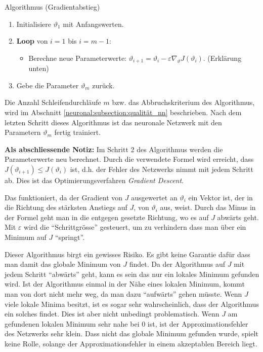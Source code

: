 \begin{aufgabe}
    Algorithmus (Gradientabstieg)
    \begin{enumerate}
        \item Initialisiere \( \vartheta_1 \) mit Anfangswerten.
        \item \textbf{Loop} von \( i = 1 \) bis \( i = m - 1 \):
        \begin{itemize}
            \item Berechne neue Parameterwerte: \( \vartheta_{i+1} = \vartheta_i - \varepsilon \nabla_\vartheta J\left(\vartheta_i\right) \). (Erklärung unten)
        \end{itemize}
        \item Gebe die Parameter \( \vartheta_m \) zurück.
    \end{enumerate}
\end{aufgabe}

Die Anzahl Schleifendurchläufe \( m \) bzw. das Abbruchskriterium des Algorithmus, wird im Abschnitt \ref{neuronal:subsection:qualität_nn} beschrieben.
Nach dem letzten Schritt dieses Algorithmus ist das neuronale Netzwerk mit den Parametern \( \vartheta_m \) fertig trainiert.

\textbf{Als abschliessende Notiz:} Im Schritt 2 des Algorithmus werden die Parameterwerte neu berechnet.
Durch die verwendete Formel wird erreicht, dass \( J(\vartheta_{i+1}) \leq J(\vartheta_i) \) ist, d.h. der Fehler des Netzwerks nimmt mit jedem Schritt ab.
Dies ist das Optimierungsverfahren \emph{Gradient Descent}.

Das funktioniert, da der Gradient von \( J \) ausgewertet an \( \vartheta_i \) ein Vektor ist, der in die Richtung des stärksten Anstiegs auf \( J \), von \(\vartheta_i \) aus, weist.
Durch das Minus in der Formel geht man in die entgegen gesetzte Richtung, wo es auf \( J \) abwärts geht. 
Mit \( \varepsilon \) wird die ``Schrittgrösse'' gesteuert, um zu verhindern dass man über ein Minimum auf \( J \) ``springt''.

Dieser Algorithmus birgt ein gewisses Risiko. 
Es gibt keine Garantie dafür dass man damit das globale Minimum von \( J \) findet.
Da der Algorithmus auf \( J \) mit jedem Schritt ``abwärts'' geht, kann es sein das nur ein lokales Minimum gefunden wird.
Ist der Algorithmus einmal in der Nähe eines lokalen Minimum, kommt man von dort nicht mehr weg, da man dazu ``aufwärts'' gehen müsste.
Wenn \( J \) viele lokale Minima besitzt, ist es sogar sehr wahrscheinlich, dass der Algorithmus ein solches findet.
Dies ist aber nicht unbedingt problematisch.
Wenn \( J \) am gefundenen lokalen Minimum sehr nahe bei 0 ist, ist der Approximationsfehler des Netzwerks sehr klein.
Dass nicht das globale Minimum gefunden wurde, spielt keine Rolle, solange der Approximationsfehler in einem akzeptablen Bereich liegt.

